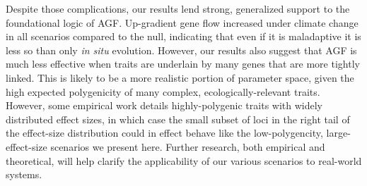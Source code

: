 \documentclass[9pt,twocolumn,twoside,lineno]{pnas-new}
\begin{document}
Despite those complications, our results lend strong, generalized support to the foundational logic of AGF.
Up-gradient gene flow increased under climate change in all scenarios compared to the null,
indicating that even if it is maladaptive it is less so than only \textit{in situ} evolution.
However, our results also suggest that AGF is much less effective when traits
are underlain by many genes that are more tightly linked.
This is likely to be a more realistic portion of parameter space,
given the high expected polygenicity
of many complex, ecologically-relevant traits. However, some empirical work
details highly-polygenic traits with widely distributed effect sizes, in which case the small
subset of loci in the right tail of the effect-size distribution could in effect
behave like the low-polygencity, large-effect-size scenarios we present here.
Further research, both empirical and theoretical, will help clarify the
applicability of our various scenarios to real-world systems.
 
\end{document}
